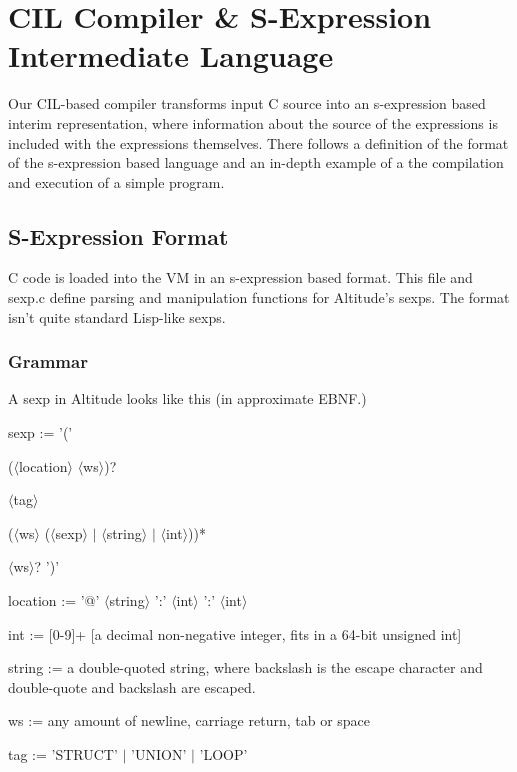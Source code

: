 \documentclass[10pt,a4paper]{report}
\begin{document}
\section{CIL Compiler \& S-Expression Intermediate Language}
Our CIL-based compiler transforms input C source into an s-expression based interim representation, where information about the source of the expressions is included with the expressions themselves. There follows a definition of the format of the s-expression based language and an in-depth example of a the compilation and execution of a simple program.

\subsection{S-Expression Format}
C code is loaded into the VM in an s-expression based format. This file and sexp.c define parsing and manipulation functions for Altitude's sexps. The format isn't quite standard Lisp-like sexps.

\subsubsection{Grammar}
A sexp in Altitude looks like this (in approximate EBNF.)
 
\begin{list}{}{}
\item sexp := '(' 
\item ($\langle$location$\rangle$ $\langle$ws$\rangle$)?
\item $\langle$tag$\rangle$
\item ($\langle$ws$\rangle$ ($\langle$sexp$\rangle$ $\vert$ $\langle$string$\rangle$ $\vert$ $\langle$int$\rangle$))*
\item $\langle$ws$\rangle$? ')'
\item
\item location := '@' $\langle$string$\rangle$ ':' $\langle$int$\rangle$ ':' $\langle$int$\rangle$
\item
\item int := [0-9]+ [a decimal non-negative integer, fits in a 64-bit unsigned int]
\item
\item string := a double-quoted string, where backslash is the escape character and double-quote and backslash are escaped.
\item
\item ws := any amount of newline, carriage return, tab or space
\item
\item tag := 'STRUCT' $\vert$ 'UNION' $\vert$ 'LOOP'
\end{list}
\end{document}
